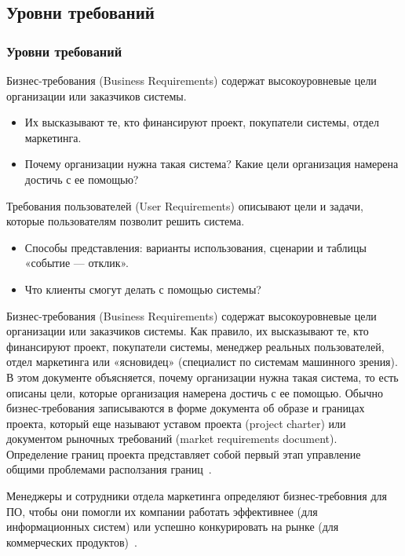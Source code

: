 \documentclass{../industrial-development}
\begin{document}
\subsection{Уровни требований}
\begin{frame} \frametitle{Уровни требований}
  \begin{block}{}
\alert{Бизнес-требования (Business Requirements)}	содержат высокоуровневые цели организации или заказчиков системы.
  \end{block}
   \begin{itemize}
\item Их высказывают те, кто финансируют проект, покупатели системы, отдел маркетинга.
\item Почему организации нужна такая система? Какие цели организация намерена достичь с ее помощью?
\end{itemize}
  \begin{block}{}
\alert{Требования пользователей (User Requirements)} описывают цели и задачи, которые пользователям позволит решить система. 
    \end{block}
		\begin{itemize}
	\item Способы представления: варианты использования, сценарии и таблицы «событие — отклик». 
	\item Что клиенты смогут делать с помощью системы?
  \end{itemize}
\end{frame}

\lecturenotes

\alert{Бизнес-требования (Business Requirements)} содержат высокоуровневые цели организации или заказчиков системы. Как правило, их высказывают те, кто финансируют проект, покупатели системы, менеджер реальных пользователей, отдел маркетинга или «ясновидец» (специалист по системам машинного зрения). В этом документе объясняется, почему организации нужна такая система, то есть описаны цели, которые организация намерена достичь с ее помощью. Обычно бизнес-требования записываются в форме документа об образе и границах проекта, который еще называют уставом проекта (project charter) или документом рыночных требований (market requirements document).
Определение границ проекта представляет собой первый этап управление общими проблемами расползания границ~\cite[с.~7]{Wiegers}.

Менеджеры и сотрудники отдела маркетинга определяют бизнес-требовния для ПО, чтобы они помогли их компании работать эффективнее (для информационных систем) или успешно конкурировать на рынке (для коммерческих продуктов)~\cite[с.~11]{Wiegers}.
\end{document}
